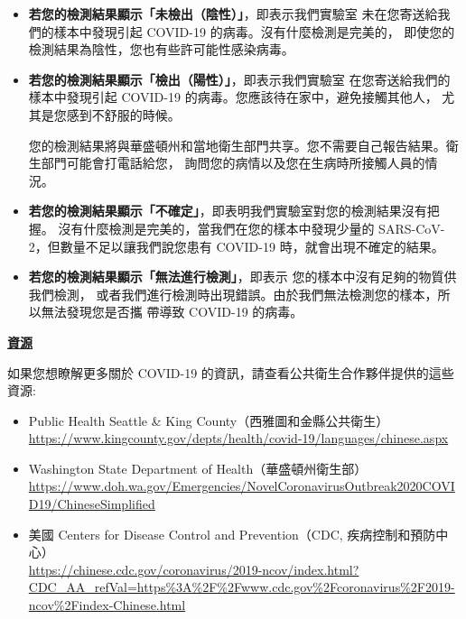 \documentclass[10pt]{article}
\begin{document}
\begin{itemize}


\item

  \textbf{若您的檢測結果顯示「未檢出（陰性）」}，即表示我們實驗室
  未在您寄送給我們的樣本中發現引起 COVID-19 的病毒。沒有什麼檢測是完美的，
  即使您的檢測結果為陰性，您也有些許可能性感染病毒。

\item

  \textbf{若您的檢測結果顯示「檢出（陽性）」}，即表示我們實驗室
  在您寄送給我們的樣本中發現引起 COVID-19 的病毒。您應該待在家中，避免接觸其他人，
  尤其是您感到不舒服的時候。

  您的檢測結果將與華盛頓州和當地衛生部門共享。您不需要自己報告結果。衛生部門可能會打電話給您，
  詢問您的病情以及您在生病時所接觸人員的情況。

\item

  \textbf{若您的檢測結果顯示「不確定」}，即表明我們實驗室對您的檢測結果沒有把握。
  沒有什麼檢測是完美的，當我們在您的樣本中發現少量的 SARS-CoV-2，但數量不足以讓我們說您患有
  COVID-19 時，就會出現不確定的結果。

\item

  \textbf{若您的檢測結果顯示「無法進行檢測」}，即表示 您的樣本中沒有足夠的物質供我們檢測，
  或者我們進行檢測時出現錯誤。由於我們無法檢測您的樣本，所以無法發現您是否攜 帶導致 COVID-19
  的病毒。

\end{itemize}

\bigskip

\large \underline{\textbf{資源}}

如果您想瞭解更多關於 COVID-19 的資訊，請查看公共衛生合作夥伴提供的這些資源:

\begin{itemize}
\item
  Public Health \textemdash Seattle \& King County（西雅圖和金縣公共衛生）\\
  \url{https://www.kingcounty.gov/depts/health/covid-19/languages/chinese.aspx}

\item

  Washington State Department of Health（華盛頓州衛生部）\\
  \url{https://www.doh.wa.gov/Emergencies/NovelCoronavirusOutbreak2020COVID19/ChineseSimplified}

\item
  美國 Centers for Disease Control and Prevention（CDC, 疾病控制和預防中心）\\
  \url{https://chinese.cdc.gov/coronavirus/2019-ncov/index.html?CDC\_AA\_refVal=https%3A%2F%2Fwww.cdc.gov%2Fcoronavirus%2F2019-ncov%2Findex-Chinese.html}

\end{itemize}
\end{document}
